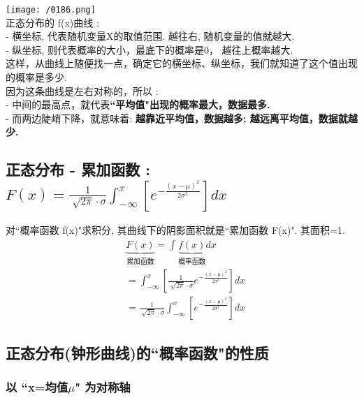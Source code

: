 \documentclass[UTF8]{ctexart}
\begin{document}
	\texttt{[image: /0186.png]} \\
	
	
	正态分布的 f(x)曲线 : \\
	- 横坐标, 代表随机变量X的取值范围. 越往右, 随机变量的值就越大. \\
	- 纵坐标, 则代表概率的大小，最底下的概率是0， 越往上概率越大. \\	
	这样，从曲线上随便找一点，确定它的横坐标、纵坐标，我们就知道了这个值出现的概率是多少. \\
	
	因为这条曲线是左右对称的，所以 : \\
	- 中间的最高点，就代表\textbf{``平均值"出现的概率最大，数据最多.} \\
	- 而两边陡峭下降，就意味着: \textbf{越靠近平均值，数据越多; 越远离平均值，数据就越少.} 
	
	
	
	
	
	\subsection{正态分布 - 累加函数 : $\boxed{
			F(x)=\frac{1}{\sqrt[]{2\pi}\cdot \sigma}\int_{-\infty}^x{\left[ e^{-\frac{(x-\mu )^2}{2\sigma ^2}} \right]}dx
		}$ }
	
	对``概率函数 f(x)"求积分, 其曲线下的阴影面积就是``累加函数 F(x)". 其面积=1. \\
	
	
	\begin{align*}  %
	&\underset{\text{累加函数}}{\underbrace{F(x)}}=\int_{}^{}{\underset{\text{概率函数}}{\underbrace{f(x)}}}dx\\
&=\int_{-\infty}^x{\left[ \frac{1}{\sqrt[]{2\pi}\cdot \sigma}e^{-\frac{(x-\mu )^2}{2\sigma ^2}} \right]}dx\\
&=\frac{1}{\sqrt[]{2\pi}\cdot \sigma}\int_{-\infty}^x{\left[ e^{-\frac{(x-\mu )^2}{2\sigma ^2}} \right]}dx
	\end{align*}



\vspace{1em} 
\subsection{正态分布(钟形曲线)的``概率函数"的性质}



\subsubsection{以 ``x=均值$\mu$" 为对称轴}
\end{document}
